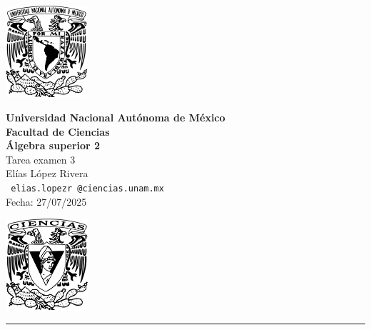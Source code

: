 \documentclass[11pt,letterpaper]{article}
\begin{document}

\begin{center}
    \begin{minipage}{3cm}
    	\begin{center}
    		\includegraphics[height=3.4cm]{logo_unam.png}
    	\end{center}
    \end{minipage}\hfill
    \begin{minipage}{10cm}
    	\begin{center}
    	\textbf{\large Universidad Nacional Autónoma de México}\\[0.1cm]
        \textbf{Facultad de Ciencias}\\[0.1cm]
        \textbf{\'Algebra superior 2}\\[0.1cm]
        Tarea examen 3 \\[0.1cm]
         El\'ias L\'opez Rivera\\[0.1cm]
        \texttt{ elias.lopezr\,@ciencias.unam.mx }\\[0.1cm]
        Fecha:\,\,27/07/2025
    	\end{center}
    \end{minipage}\hfill
    \begin{minipage}{3cm}
    	\begin{center}
    		\includegraphics[height=3.4cm]{logo_FC.png}
    	\end{center}
    \end{minipage}
\end{center}

\rule{17cm}{0.1mm}

\end{document}
